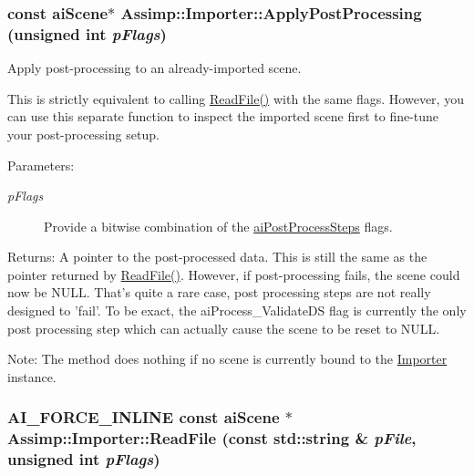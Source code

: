 \hypertarget{class_assimp_1_1_importer_5872e749c1451fee64183fc14f1fc81d}{
\subsubsection[ApplyPostProcessing]{\setlength{\rightskip}{0pt plus 5cm}const {\bf aiScene}$\ast$ Assimp::Importer::ApplyPostProcessing (unsigned int {\em pFlags})}}
\label{class_assimp_1_1_importer_5872e749c1451fee64183fc14f1fc81d}


Apply post-processing to an already-imported scene.

This is strictly equivalent to calling \hyperlink{class_assimp_1_1_importer_174418ab41d5b8bc51a044895cb991e5}{ReadFile()} with the same flags. However, you can use this separate function to inspect the imported scene first to fine-tune your post-processing setup. \begin{Desc}
\item[Parameters:]
\begin{description}
\item[{\em pFlags}]Provide a bitwise combination of the \hyperlink{postprocess_8h_64795260b95f5a4b3f3dc1be4f52e410}{aiPostProcessSteps} flags. \end{description}
\end{Desc}
\begin{Desc}
\item[Returns:]A pointer to the post-processed data. This is still the same as the pointer returned by \hyperlink{class_assimp_1_1_importer_174418ab41d5b8bc51a044895cb991e5}{ReadFile()}. However, if post-processing fails, the scene could now be NULL. That's quite a rare case, post processing steps are not really designed to 'fail'. To be exact, the aiProcess\_\-ValidateDS flag is currently the only post processing step which can actually cause the scene to be reset to NULL.\end{Desc}
\begin{Desc}
\item[Note:]The method does nothing if no scene is currently bound to the \hyperlink{class_assimp_1_1_importer_2c207299ed05f1db1ad1e6dab005f719}{Importer} instance. \end{Desc}
\hypertarget{class_assimp_1_1_importer_339882c7acb47d5b5110bbd078d870a9}{
\subsubsection[ReadFile]{\setlength{\rightskip}{0pt plus 5cm}AI\_\-FORCE\_\-INLINE const {\bf aiScene} $\ast$ Assimp::Importer::ReadFile (const std::string \& {\em pFile}, \/  unsigned int {\em pFlags})}}
\label{class_assimp_1_1_importer_339882c7acb47d5b5110bbd078d870a9}


